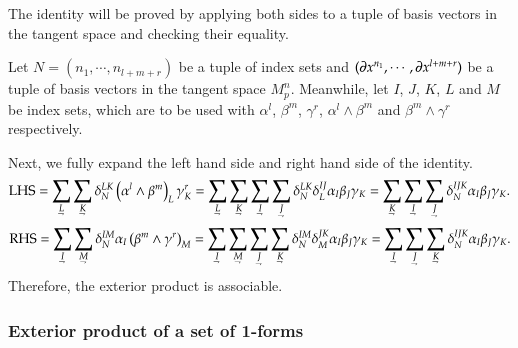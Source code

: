 \documentclass[11pt, a4paper]{book}
\begin{document}
\begin{Proof}
  The identity will be proved by applying both sides to a tuple of basis vectors in the
  tangent space and checking their equality.

  Let $N = (n_1, \cdots, n_{l+m+r})$ be a tuple of index sets and
  $(\boldsymbol{\partial}x^{n_1},\cdots,\boldsymbol{\partial}x^{l+m+r})$ be a tuple of basis vectors in
  the tangent space $M_p^n$. Meanwhile, let $I$, $J$, $K$, $L$ and $M$ be index sets,
  which are to be used with $\alpha^l$, $\beta^m$, $\gamma^r$, $\alpha^l\wedge\beta^m$ and
  $\beta^m\wedge\gamma^r$ respectively.

  Next, we fully expand the left hand side and right hand side of the identity.
\begin{equation}
    \lhs =
    \sum_{\underaccent{\rightharpoondown}{L}}\sum_{\underaccent{\rightharpoondown}{K}}
    \delta_N^{LK} \left( \alpha^l\wedge\beta^m \right)_L \gamma^r_K =
    \sum_{\underaccent{\rightharpoondown}{L}}\sum_{\underaccent{\rightharpoondown}{K}}
    \sum_{\underaccent{\rightharpoondown}{I}}\sum_{\underaccent{\rightharpoondown}{J}}
    \delta_N^{LK}\delta_L^{IJ} \alpha_I\beta_J\gamma_K =
    \sum_{\underaccent{\rightharpoondown}{K}}\sum_{\underaccent{\rightharpoondown}{I}}\sum_{\underaccent{\rightharpoondown}{J}}
    \delta_N^{IJK} \alpha_I\beta_J\gamma_K.
  \end{equation}
  \begin{equation}
    \rhs =
    \sum_{\underaccent{\rightharpoondown}{I}}\sum_{\underaccent{\rightharpoondown}{M}}
    \delta_N^{IM}\alpha_I
    \left( \beta^m\wedge\gamma^r \right)_M =
    \sum_{\underaccent{\rightharpoondown}{I}}\sum_{\underaccent{\rightharpoondown}{M}}
    \sum_{\underaccent{\rightharpoondown}{J}}\sum_{\underaccent{\rightharpoondown}{K}}
    \delta_N^{IM}\delta_M^{JK} \alpha_I\beta_J\gamma_K =
    \sum_{\underaccent{\rightharpoondown}{I}}\sum_{\underaccent{\rightharpoondown}{J}}
    \sum_{\underaccent{\rightharpoondown}{K}} \delta_N^{IJK}\alpha_I\beta_J\gamma_K.
  \end{equation}
  Therefore, the exterior product is associable.
\end{Proof}

\subsubsection{Exterior product of a set of 1-forms}
\end{document}
